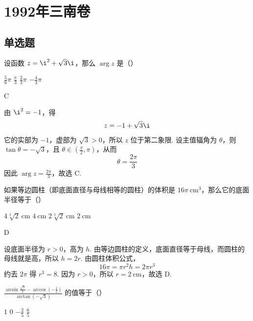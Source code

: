 \chapter{1992年三南卷}
\section{单选题}

\begin{problem}
设函数 \(z=\i^2+\sqrt{3}\i\)，那么 \(\arg z\) 是（\quad）

\choices
    {\(\frac{5}{6}\pi\)}
    {\(\frac{\pi}{3}\)}
    {\(\frac{2}{3}\pi\)}
    {\(-\frac{4}{3}\pi\)}
\end{problem}

\begin{answer}
C
\end{answer}

\begin{solution}
由 \(\i^2=-1\)，得
\[
z=-1+\sqrt{3}\i
\]
它的实部为 \(-1\)，虚部为 \(\sqrt{3}>0\)，所以 \(z\) 位于第二象限. 设主值辐角为 \(\theta\)，则 \(\tan\theta=-\sqrt{3}\)，且 \(\theta\in(\frac{\pi}{2},\pi)\)，从而
\[
\theta=\frac{2\pi}{3}
\]
因此 \(\arg z=\frac{2\pi}{3}\)，故选 C.
\end{solution}

\begin{problem}
如果等边圆柱（即底面直径与母线相等的圆柱）的体积是 \(16\pi\mathrm{~cm}^3\)，那么它的底面半径等于（\quad）

\choices
    {\(4\sqrt[3]{2}\mathrm{~cm}\)}
    {\(4\mathrm{~cm}\)}
    {\(2\sqrt[3]{2}\mathrm{~cm}\)}
    {\(2\mathrm{~cm}\)}
\end{problem}

\begin{answer}
D
\end{answer}

\begin{solution}
设底面半径为 \(r>0\)，高为 \(h\). 由等边圆柱的定义，底面直径等于母线，而圆柱的母线就是高，所以 \(h=2r\). 由圆柱体积公式，
\[
16\pi=\pi r^2h=2\pi r^3
\]
约去 \(2\pi\) 得 \(r^3=8\). 因为 \(r>0\)，所以 \(r=2\mathrm{~cm}\)，故选 D.
\end{solution}

\begin{problem}
\(\frac{\arcsin \frac{\sqrt{3}}{2}-\arccos \left( -\frac{1}{2} \right)}{\arctan \left( -\sqrt{3} \right)}\) 的值等于（\quad）

\choices
    {\(1\)}
    {\(0\)}
    {\(-\frac{2}{5}\)}
    {\(\frac{6}{5}\)}
\end{problem}

